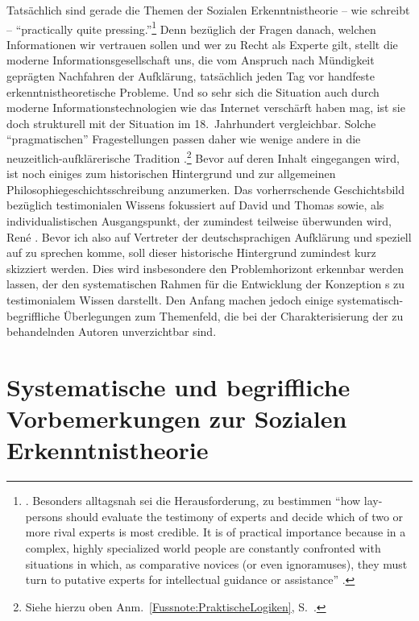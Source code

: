 Tatsächlich sind gerade die Themen der Sozialen Erkenntnistheorie -- wie
 schreibt -- \enquote{practically quite
pressing.}\footnote{\cite[][85]{Goldman:Experts:WhichOnesShouldYouTrust?2001}. 
Besonders alltagsnah sei die Herausforderung, zu bestimmen \enquote{how
lay-persons should evaluate the testimony of experts and decide which of two or
more rival experts is most credible. It is of practical importance because in a
complex, highly specialized world people are constantly confronted with
situations in which, as comparative novices (or even ignoramuses), they must
turn to putative experts for intellectual guidance or assistance}
\parencite[][85]{Goldman:Experts:WhichOnesShouldYouTrust?2001}.} Denn bezüglich
der Fragen danach, welchen Informationen wir vertrauen sollen und wer zu Recht
als Experte gilt, stellt die moderne Informationsgesellschaft uns, die vom
Anspruch nach Mündigkeit geprägten Nachfahren der Aufklärung, tatsächlich jeden
Tag vor handfeste erkenntnistheoretische Probleme. Und so sehr sich die
Situation auch durch moderne Informationstechnologien wie das Internet
verschärft haben mag, ist sie doch strukturell mit der Situation im
18.~Jahrhundert vergleichbar. Solche \enquote{pragmatischen} Fragestellungen
passen daher wie wenige andere in die neuzeitlich-aufklärerische Tradition
.\footnote{Siehe hierzu oben
Anm.~\ref{Fussnote:PraktischeLogiken}, S.~\pageref{Fussnote:PraktischeLogiken}.}
Bevor auf deren Inhalt eingegangen wird, ist noch einiges zum historischen
Hintergrund und zur allgemeinen Philosophiegeschichtsschreibung anzumerken. Das
vorherrschende Geschichtsbild bezüglich testimonialen Wissens fokussiert auf
David  und Thomas  sowie, als
individualistischen Ausgangspunkt, der zumindest teilweise überwunden wird,
Ren{\'e} . Bevor ich also auf Vertreter der deutschsprachigen
Aufklärung und speziell auf  zu sprechen komme, soll dieser historische Hintergrund zumindest kurz skizziert
werden. Dies wird insbesondere den Problemhorizont erkennbar werden lassen, der
den systematischen Rahmen für die Entwicklung der Konzeption s zu
testimonialem Wissen darstellt. Den Anfang machen jedoch einige
systematisch-begriffliche Überlegungen zum Themenfeld, die bei der
Charakterisierung der zu behandelnden Autoren unverzichtbar sind.


\section[Vorbemerkungen zur Sozialen Erkenntnistheorie]{Systematische und
begriffliche Vorbemerkungen zur
Sozialen
Erkenntnistheorie}\label{section:SystematischeundbegrifflicheVorbemerkungen}


